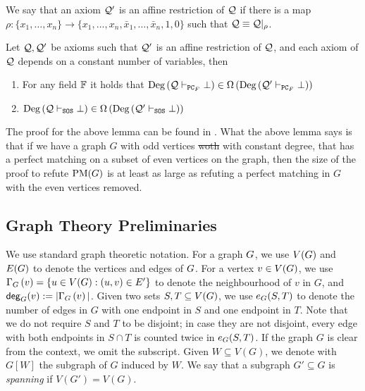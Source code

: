 \documentclass[11pt]{article}
\providecommand{\DIFadd}[1]{\textcolor{shin-ryoku}{#1}}%
\providecommand{\DIFdel}[1]{\textcolor{verylightgray}{\sout{#1}}}                      %
\providecommand{\DIFaddbegin}{} %
\providecommand{\DIFaddend}{} %
\providecommand{\DIFdelbegin}{} %
\providecommand{\DIFdelend}{} %
\begin{document}
\begin{definition}\label{def:affine-restriction}
We say that an axiom $\Axioms'$ is an
affine restriction of $\Axioms$ if there is a map $\rho : \{x_1,\dots,x_n\} \rightarrow \{x_1, \dots, x_n, \bar{x}_1, \dots, \bar{x}_n, 1, 0 \}$ such that $\Axioms \equiv \Axioms|_{\rho}$.
\end{definition}


\begin{lemma}\label{lemma:affine_restriction}
Let $\Axioms, \Axioms'$ be axioms such that $\Axioms'$ is an affine restriction of $\Axioms$, and each axiom
of $\Axioms$ depends on a constant number of variables, then
\begin{enumerate}
	\item For any field $\Field$ it holds that $\Degree{\Axioms \PC \bot} \in \BigOmega{\Degree{\Axioms' \PC \bot}}$
	\item $\Degree{\Axioms \SOS \bot} \in \BigOmega{\Degree{\Axioms' \SOS \bot}}$
\end{enumerate}
\end{lemma}

The proof for the above lemma can be found in \citep[Lemma 2.2]{Austrin_2022}.
What the above lemma says is that if we have a graph $G$ with odd vertices \DIFdelbegin \DIFdel{woth }\DIFdelend \DIFaddbegin \DIFadd{with }\DIFaddend constant degree, that has a perfect matching on a subset of even vertices on the graph, then the size of the proof to refute $\PM{G}$ is at least as large as refuting a perfect matching in $G$ with the even vertices removed.


\subsection{Graph Theory Preliminaries}
\label{sec:graph-theory-prelims}

We use standard graph theoretic notation. For a graph $\Graph$, we use $\Vertices{\Graph}$ and $\Edges{\Graph}$ to denote the vertices and edges of $\Graph$. For a vertex $v \in \Vertices{\Graph}$, we use $\Neighbourhood{G}{v} = \{ u \in \Vertices{\Graph} : (u,v) \in E' \}$ to denote the neighbourhood of $v$ in $G$, and $\degree{G}{v} := |\Neighbourhood{G}{v}|$. Given two sets $S, T \subseteq \Vertices{G}$, we  use $\CutEdges{S}{T}{G}$ to denote the number of edges in $G$ with one endpoint in $S$ and one endpoint in $T$.  Note that we do not require $S$ and $T$ to be disjoint; in case they are not disjoint, every edge with both endpoints in $S \cap T$ is counted twice in $\CutEdges{S}{T}{G}$. If the graph $G$ is clear from the context, we omit the subscript. Given $W \subseteq V(G)$, we denote with $G[W]$ the subgraph of $G$ induced by $W$. We say that a subgraph $G' \subseteq G$ is \emph{spanning} if $V(G') = V(G)$.
\end{document}
